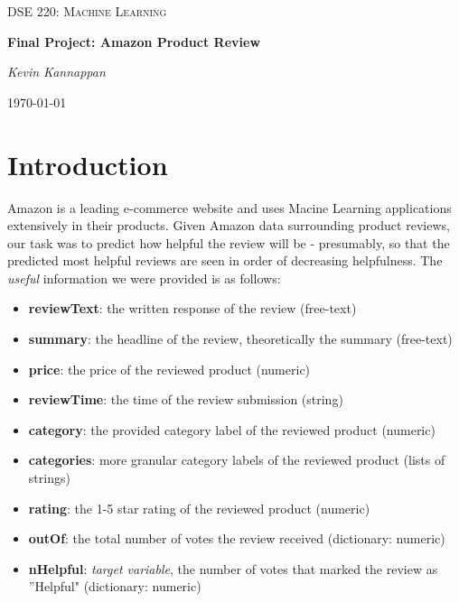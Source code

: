 \documentclass[12pt]{article}
\theoremstyle{plain}
\theoremstyle{definition}
\numberwithin{equation}{theorem}
\begin{document}
\begin{titlepage}
	\centering
	\vspace{4cm}
	{\scshape\Large DSE 220: Machine Learning\par}
	\vspace{1.5cm}
	{\huge\bfseries Final Project: Amazon Product Review\par}
	\vspace{2cm}
	{\Large\itshape Kevin Kannappan\par}

	{\large \today\par}
\end{titlepage}


\section{Introduction}

Amazon is a leading e-commerce website and uses Macine Learning applications extensively in their products. Given Amazon data surrounding product reviews, our task was to predict how helpful the review will be - presumably, so that the predicted most helpful reviews are seen in order of decreasing helpfulness. The \textit{useful} information we were provided is as follows:
\begin{itemize}
\item \textbf{reviewText}: the written response of the review  (free-text)
\item \textbf{summary}: the headline of the review, theoretically the summary (free-text)
\item \textbf{price}: the price of the reviewed product (numeric)
\item \textbf{reviewTime}: the time of the review submission (string)
\item \textbf{category}: the provided category label of the reviewed product (numeric)
\item \textbf{categories}: more granular category labels of the reviewed product (lists of strings)
\item \textbf{rating}: the 1-5 star rating of the reviewed product (numeric)
\item \textbf{outOf}: the total number of votes the review received (dictionary: numeric)
\item \textbf{nHelpful}: \textit{target variable}, the number of votes that marked the review as ''Helpful" (dictionary: numeric)
\end{itemize}
\end{document}
